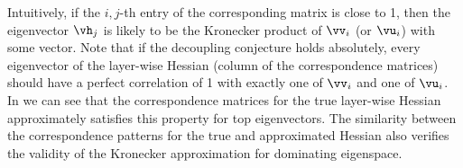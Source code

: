 Intuitively, if the $i,j$-th entry of the corresponding matrix is close to 1, then the eigenvector $\vh_j$ is likely to be the Kronecker product of $\vv_i$ (or $\vu_i$) with some vector. Note that if the decoupling conjecture holds absolutely, every eigenvector of the layer-wise Hessian (column of the correspondence matrices) should have a perfect correlation of 1 with exactly one of $\vv_i$ and one of $\vu_i$.
In  we can see that the correspondence matrices for the true layer-wise Hessian approximately satisfies this property for top eigenvectors. The similarity between the correspondence patterns for the true and approximated Hessian also verifies the validity of the Kronecker approximation for dominating eigenspace.

